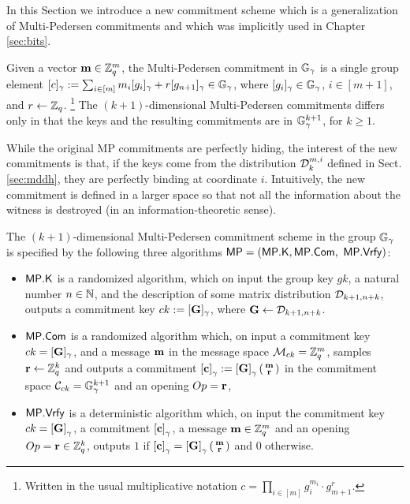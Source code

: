 In this Section we introduce a new commitment scheme which is a generalization of Multi-Pedersen commitments and which was implicitly used in Chapter \ref{sec:bits}. 

Given a vector $\mathbf{m}\in\mathbb{Z}_q^m$, the Multi-Pedersen commitment in $\mathbb{G}_{\gamma}$ is a single group element $[c]_\gamma:=\sum_{i\in [m]} m_i[g_i]_\gamma+r[g_{n+1}]_\gamma \in\mathbb{G}_\gamma$, where $[g_i]_{\gamma}\in\mathbb{G}_\gamma$, $i\in[m+1]$, and $r\gets\mathbb{Z}_q$. \footnote{Written in the usual multiplicative notation $c=\prod_{i\in[m]}g_i^{m_i} \cdot g_{m+1}^r$.}  The $(k+1)$-dimensional Multi-Pedersen commitments 
differs only in that the keys and the resulting commitments are in 
$\mathbb{G}_{\gamma}^{k+1}$, for $k\geq 1$. 


While the original MP commitments are perfectly hiding, the interest of the new commitments is that, if the keys come from the distribution $\mathcal{D}_k^{m,i}$ defined in Sect. \ref{sec:mddh}, they are perfectly binding at coordinate $i$. Intuitively, the new commitment is defined in a larger space so that not all the information about the witness is destroyed (in an information-theoretic sense). 

\begin{definition} The $(k+1)$-dimensional Multi-Pedersen commitment scheme in the group $\mathbb{G}_\gamma$ 
is specified by the following three algorithms 
	$\mathsf{MP}=(\mathsf{MP}.\mathsf{K},\mathsf{MP}.\mathsf{Com},$ $ \mathsf{MP}.\mathsf{Vrfy})$:
	\begin{itemize} 
		\item  $\mathsf{MP}.\mathsf{K}$ is a randomized algorithm, which on input the group key $gk$, a natural number $n \in \mathbb{N}$, and the description of some matrix distribution $\mathcal{D}_{k+1,n+k}$, 
		outputs a commitment key $ck:=[\mathbf{{G}}]_\gamma$, where $\mathbf{{G}} \gets \mathcal{D}_{k+1,n+k}$.
		\item $\mathsf{MP}.\mathsf{Com}$ is a randomized algorithm which, on input a commitment key $ck=[\mathbf{{G}}]_\gamma$, and a message 
		$\mathbf{m}$ in the message space $\mathcal{M}_{ck}=\mathbb{Z}_q^{m}$, samples $\mathbf{r} \gets \mathbb{Z}_q^k$ and outputs a commitment $\left[\mathbf{c}\right]_\gamma:=\left[\mathbf{{G}}\right]_\gamma\left(\begin{smallmatrix}\mathbf{m} \\ \mathbf{r}\end{smallmatrix}\right)$ in the commitment space $\mathcal{C}_{ck}=\mathbb{G}_\gamma^{k+1}$ and an opening $Op=\mathbf{r}$, 
		\item $\mathsf{MP}.\mathsf{Vrfy}$ is a deterministic algorithm which, on input the commitment key $ck=\left[\mathbf{{G}}\right]_\gamma$, a commitment $\left[\mathbf{c}\right]_\gamma$,  a message 
		$\mathbf{m} \in \mathbb{Z}_q^{m}$ and an opening $Op=\mathbf{r}\in\mathbb{Z}_q^k$, outputs $1$ if $\left[\mathbf{c}\right]_\gamma=\left[\mathbf{{G}}\right]_\gamma\left(\begin{smallmatrix}\mathbf{m} \\ \mathbf{r}\end{smallmatrix}\right)$
		and $0$ otherwise. 
	\end{itemize}
\end{definition}

